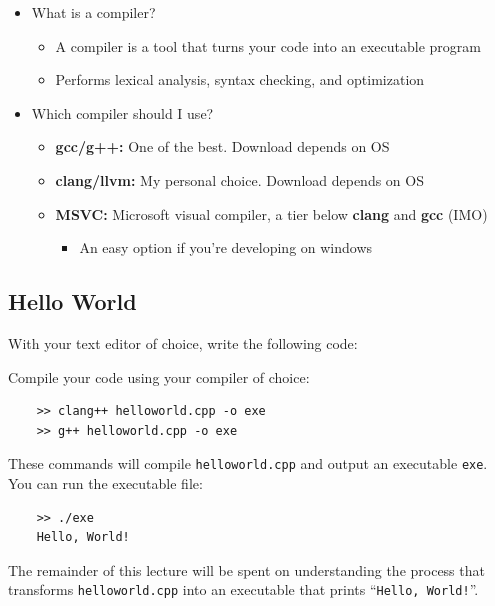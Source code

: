 \documentclass{article}
\begin{document}
\begin{itemize}
	\item What is a compiler? \begin{itemize}
		\item A compiler is a tool that turns your code into an executable program
		\item Performs lexical analysis, syntax checking, and optimization
	\end{itemize}
	\item Which compiler should I use?
	\begin{itemize}
		\item \textbf{gcc/g++:} One of the best. Download depends on OS
		\item \textbf{clang/llvm:} My personal choice. Download depends on OS
		\item \textbf{MSVC:} Microsoft visual compiler, a tier below \textbf{clang} and \textbf{gcc} (IMO)
		\begin{itemize}
			\item An easy option if you're developing on windows
		\end{itemize}
	\end{itemize}
\end{itemize}

\subsection{Hello World}

\noindent
With your text editor of choice, write the following code:



\noindent
Compile your code using your compiler of choice:

\begin{verbatim}
	>> clang++ helloworld.cpp -o exe
	>> g++ helloworld.cpp -o exe
\end{verbatim}

\noindent
These commands will compile \texttt{helloworld.cpp} and output an executable \texttt{exe}. You can run the executable file:

\begin{verbatim}
	>> ./exe
	Hello, World!
\end{verbatim}

\noindent
The remainder of this lecture will be spent on understanding the process that transforms \texttt{helloworld.cpp} into an executable that prints ``\texttt{Hello, World!}''.
\end{document}
